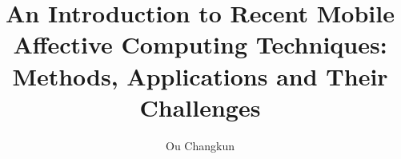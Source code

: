 \documentclass[journal]{vgtc}
\title{An Introduction to Recent Mobile Affective Computing Techniques: \\Methods, Applications and Their Challenges}
\author{Ou Changkun}
\begin{document}
\maketitle







\nocite{*}
\printbibliography
\end{document}
